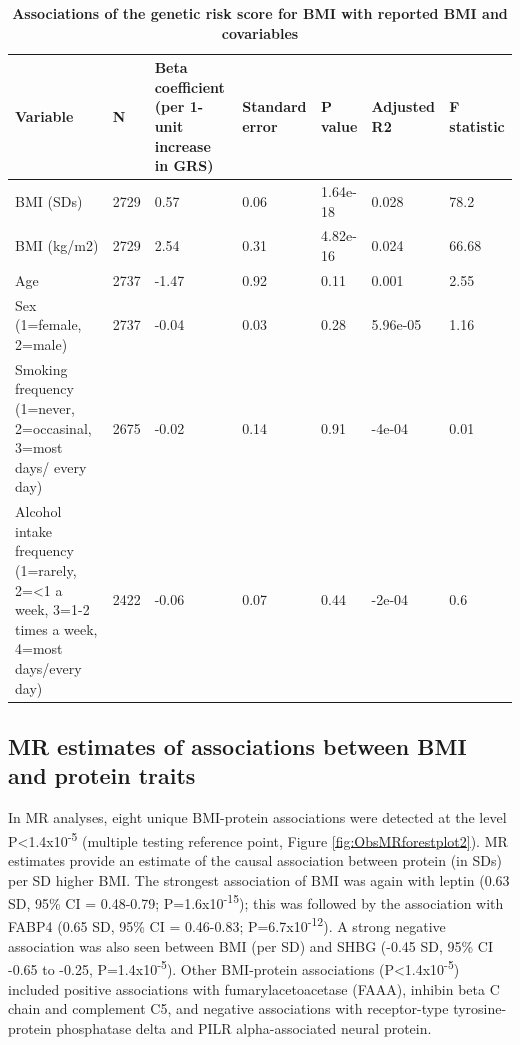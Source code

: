 \documentclass[11pt,twoside]{bristolthesis}
\begin{document}
\begin{landscape}\begin{table}

\caption[Associations of the genetic risk score for BMI with reported BMI and covariables]{\label{tab:INT-GRS-confounders}\textbf{Associations of the genetic risk score for BMI with reported BMI and covariables}}
\centering
\begin{tabu} to 
\toprule
Variable & N & Beta coefficient (per 1-unit increase in GRS) & Standard error & P value & Adjusted R2 & F statistic\\
\midrule
BMI (SDs) & 2729 & 0.57 & 0.06 & 1.64e-18 & 0.028 & 78.2\\
BMI (kg/m2) & 2729 & 2.54 & 0.31 & 4.82e-16 & 0.024 & 66.68\\
Age & 2737 & -1.47 & 0.92 & 0.11 & 0.001 & 2.55\\
Sex (1=female, 2=male) & 2737 & -0.04 & 0.03 & 0.28 & 5.96e-05 & 1.16\\
Smoking frequency (1=never, 2=occasinal, 3=most days/ every day) & 2675 & -0.02 & 0.14 & 0.91 & -4e-04 & 0.01\\
\addlinespace
Alcohol intake frequency (1=rarely, 2=<1 a week, 3=1-2 times a week, 4=most days/every day) & 2422 & -0.06 & 0.07 & 0.44 & -2e-04 & 0.6\\
\bottomrule
\end{tabu}
\end{table}
\end{landscape}
\hypertarget{mr-estimates-of-associations-between-bmi-and-protein-traits}{%
\subsection{MR estimates of associations between BMI and protein traits}\label{mr-estimates-of-associations-between-bmi-and-protein-traits}}

In MR analyses, eight unique BMI-protein associations were detected at the level P\textless1.4x10\textsuperscript{-5} (multiple testing reference point, Figure \ref{fig:ObsMRforestplot2}). MR estimates provide an estimate of the causal association between protein (in SDs) per SD higher BMI. The strongest association of BMI was again with leptin (0.63 SD, 95\% CI = 0.48-0.79; P=1.6x10\textsuperscript{-15}); this was followed by the association with FABP4 (0.65 SD, 95\% CI = 0.46-0.83; P=6.7x10\textsuperscript{-12}). A strong negative association was also seen between BMI (per SD) and SHBG (-0.45 SD, 95\% CI -0.65 to -0.25, P=1.4x10\textsuperscript{-5}). Other BMI-protein associations (P\textless1.4x10\textsuperscript{-5}) included positive associations with fumarylacetoacetase (FAAA), inhibin beta C chain and complement C5, and negative associations with receptor-type tyrosine-protein phosphatase delta and PILR alpha-associated neural protein.
\end{document}
